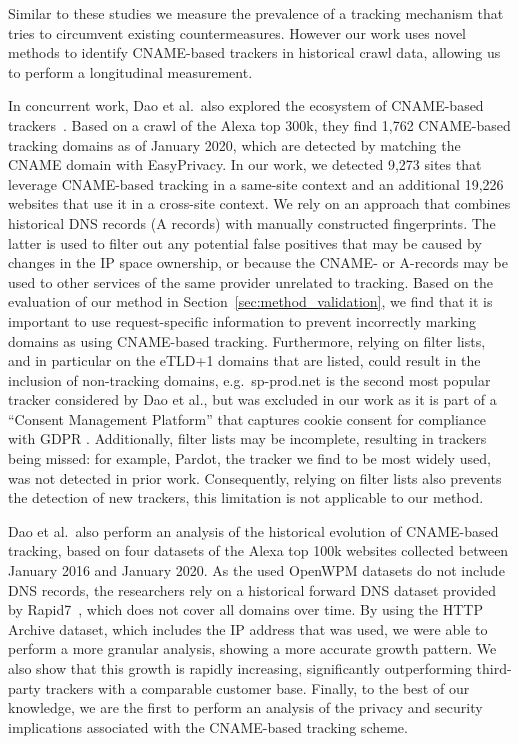 Similar to these studies we measure the prevalence of a tracking mechanism that tries to circumvent existing countermeasures. However our work uses novel methods to identify CNAME-based trackers in historical crawl data, allowing us to perform a longitudinal measurement.


In concurrent work, Dao et al.\ also explored the ecosystem of CNAME-based trackers~\cite{dao2020cnamecloaking}.
Based on a crawl of the Alexa top 300k, they find 1,762 CNAME-based tracking domains as of January 2020, which are detected by matching the CNAME domain with EasyPrivacy.
In our work, we detected 9,273 sites that leverage CNAME-based tracking in a same-site context and an additional 19,226 websites that use it in a cross-site context.
We rely on an approach that combines historical DNS records (A records) with manually constructed fingerprints.
The latter is used to filter out any potential false positives that may be caused by changes in the IP space ownership, or because the CNAME- or A-records may be used to other services of the same provider unrelated to tracking.
Based on the evaluation of our method in Section~\ref{sec:method_validation}, we find that it is important to use request-specific information to prevent incorrectly marking domains as using CNAME-based tracking.
Furthermore, relying on filter lists, and in particular on the eTLD+1 domains that are listed, could result in the inclusion of non-tracking domains, e.g.\ sp-prod.net is the second most popular tracker considered by Dao et al., but was excluded in our work as it is part of a ``Consent Management Platform'' that captures cookie consent for compliance with GDPR \cite{CMP}.
Additionally, filter lists may be incomplete, resulting in trackers being missed: for example, Pardot, the tracker we find to be most widely used, was not detected in prior work.
Consequently, relying on filter lists also prevents the detection of new trackers, this limitation is not applicable to our method.

Dao et al.\ also perform an analysis of the historical evolution of CNAME-based tracking, based on four datasets of the Alexa top 100k websites collected between January 2016 and January 2020.
As the used OpenWPM datasets do not include DNS records, the researchers rely on a historical forward DNS dataset provided by Rapid7~\cite{rapid7fdns}, which does not cover all domains over time.
By using the HTTP Archive dataset, which includes the IP address that was used, we were able to perform a more granular analysis, showing a more accurate growth pattern.
We also show that this growth is rapidly increasing, significantly outperforming third-party trackers with a comparable customer base.
Finally, to the best of our knowledge, we are the first to perform an analysis of the privacy and security implications associated with the CNAME-based tracking scheme.
